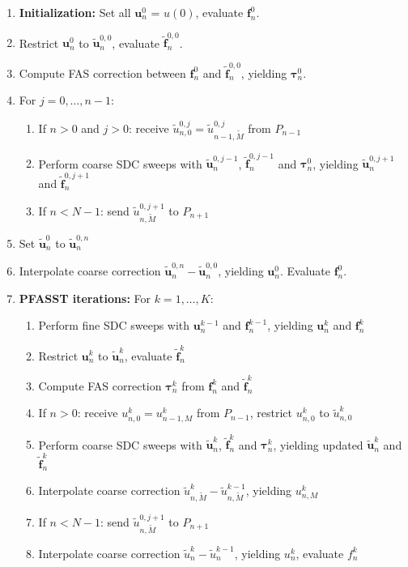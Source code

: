 \begin{enumerate}
    \item \textbf{Initialization:} Set all \(\bm{u}^0_n\) = \(u(0)\), evaluate \(\bm{f}^0_n\).
    \item Restrict \(\bm{u}^0_n\) to \(\bm{\tilde{u}}^{0,0}_n\), evaluate \(\bm{\tilde{f}}^{0,0}_n\).
    \item Compute FAS correction between \(\bm{f}^0_n\) and \(\bm{\tilde{f}}^{0,0}_n\), yielding \(\bm{\tau}^0_n\).
    \item For \(j = 0, \dots, n-1\):
        \begin{enumerate}    
            \item If \(n > 0\) and \(j > 0\): receive \(\tilde{u}^{0,j}_{n,0}=\tilde{u}^{0,j}_{n-1,\tilde{M}}\) from \(P_{n-1}\)
            \item Perform coarse SDC sweeps with \(\bm{\tilde{u}}^{0,j-1}_{n}\), \(\bm{\tilde{f}}^{0,j-1}_n\) and \(\bm{\tau}^0_n\), yielding \(\bm{\tilde{u}}^{0,j+1}_{n}\) and \(\bm{\tilde{f}}^{0,j+1}_n\)
            \item If \(n < N-1\): send \(\tilde{u}^{0,j+1}_{n,\tilde{M}}\) to \(P_{n+1}\)
        \end{enumerate}
    \item Set \(\bm{\tilde{u}}^{0}_{n}\) to \(\bm{\tilde{u}}^{0,n}_{n}\)\)%
    \item Interpolate coarse correction \(\bm{\tilde{u}}^{0,n}_{n} - \bm{\tilde{u}}^{0,0}_{n}\), yielding \(\bm{u}^{0}_{n}\). Evaluate \(\bm{f}^{0}_{n}\).
    \item \textbf{PFASST iterations:} For \(k = 1, \dots, K\):
        \begin{enumerate}
            \item Perform fine SDC sweeps with \(\bm{u}^{k-1}_{n}\) and \(\bm{f}^{k-1}_{n}\), yielding \(\bm{u}^{k}_{n}\) and \(\bm{f}^{k}_{n}\)
            \item Restrict \(\bm{u}^{k}_{n}\) to \(\bm{\tilde{u}}^{k}_{n}\), evaluate \(\bm{\tilde{f}}^{k}_{n}\)
            \item Compute FAS correction \(\bm{\tau}^k_n\) from \(\bm{f}^{k}_{n}\) and \(\bm{\tilde{f}}^{k}_{n}\)
            \item If \(n > 0\): receive \(u^{k}_{n,0}=u^{k}_{n-1,M}\) from \(P_{n-1}\), restrict \(u^{k}_{n,0}\) to \(\tilde{u}^{k}_{n,0}\)
            \item Perform coarse SDC sweeps with \(\bm{\tilde{u}}^{k}_{n}\), \(\bm{\tilde{f}}^{k}_{n}\) and \(\bm{\tau}^k_n\), yielding updated \(\bm{\tilde{u}}^{k}_{n}\) and \(\bm{\tilde{f}}^{k}_{n}\)
            \item Interpolate coarse correction \(\tilde{u}^{k}_{n,\tilde{M}} - \tilde{u}^{k-1}_{n,\tilde{M}}\), yielding \(u^{k}_{n,M}\)
            \item If \(n < N-1\): send \(\tilde{u}^{0,j+1}_{n,\tilde{M}}\) to \(P_{n+1}\)
            \item Interpolate coarse correction \(\tilde{u}^{k}_{n} - \tilde{u}^{k-1}_{n}\), yielding \(u^{k}_{n}\), evaluate \(f^{k}_{n}\)
        \end{enumerate}
\end{enumerate}

